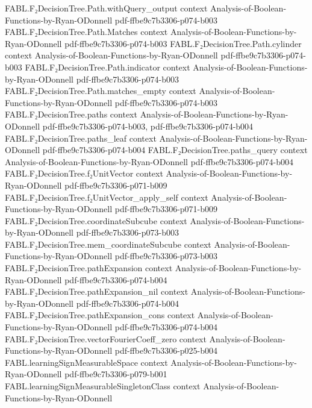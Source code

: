 \begin{theorem}
  {FABL.F₂DecisionTree.Path.withQuery_output}
  {context}
  {Analysis-of-Boolean-Functions-by-Ryan-ODonnell}
  {pdf-ffbe9c7b3306-p074-b003}
\proofstep
  {FABL.F₂DecisionTree.Path.Matches}
  {context}
  {Analysis-of-Boolean-Functions-by-Ryan-ODonnell}
  {pdf-ffbe9c7b3306-p074-b003}
\proofstep
  {FABL.F₂DecisionTree.Path.cylinder}
  {context}
  {Analysis-of-Boolean-Functions-by-Ryan-ODonnell}
  {pdf-ffbe9c7b3306-p074-b003}
\proofstep
  {FABL.F₂DecisionTree.Path.indicator}
  {context}
  {Analysis-of-Boolean-Functions-by-Ryan-ODonnell}
  {pdf-ffbe9c7b3306-p074-b003}
\proofstep
  {FABL.F₂DecisionTree.Path.matches_empty}
  {context}
  {Analysis-of-Boolean-Functions-by-Ryan-ODonnell}
  {pdf-ffbe9c7b3306-p074-b003}
\proofstep
  {FABL.F₂DecisionTree.paths}
  {context}
  {Analysis-of-Boolean-Functions-by-Ryan-ODonnell}
  {pdf-ffbe9c7b3306-p074-b003,
    pdf-ffbe9c7b3306-p074-b004}
\proofstep
  {FABL.F₂DecisionTree.paths_leaf}
  {context}
  {Analysis-of-Boolean-Functions-by-Ryan-ODonnell}
  {pdf-ffbe9c7b3306-p074-b004}
\proofstep
  {FABL.F₂DecisionTree.paths_query}
  {context}
  {Analysis-of-Boolean-Functions-by-Ryan-ODonnell}
  {pdf-ffbe9c7b3306-p074-b004}
\proofstep
  {FABL.F₂DecisionTree.f₂UnitVector}
  {context}
  {Analysis-of-Boolean-Functions-by-Ryan-ODonnell}
  {pdf-ffbe9c7b3306-p071-b009}
\proofstep
  {FABL.F₂DecisionTree.f₂UnitVector_apply_self}
  {context}
  {Analysis-of-Boolean-Functions-by-Ryan-ODonnell}
  {pdf-ffbe9c7b3306-p071-b009}
\proofstep
  {FABL.F₂DecisionTree.coordinateSubcube}
  {context}
  {Analysis-of-Boolean-Functions-by-Ryan-ODonnell}
  {pdf-ffbe9c7b3306-p073-b003}
\proofstep
  {FABL.F₂DecisionTree.mem_coordinateSubcube}
  {context}
  {Analysis-of-Boolean-Functions-by-Ryan-ODonnell}
  {pdf-ffbe9c7b3306-p073-b003}
\proofstep
  {FABL.F₂DecisionTree.pathExpansion}
  {context}
  {Analysis-of-Boolean-Functions-by-Ryan-ODonnell}
  {pdf-ffbe9c7b3306-p074-b004}
\proofstep
  {FABL.F₂DecisionTree.pathExpansion_nil}
  {context}
  {Analysis-of-Boolean-Functions-by-Ryan-ODonnell}
  {pdf-ffbe9c7b3306-p074-b004}
\proofstep
  {FABL.F₂DecisionTree.pathExpansion_cons}
  {context}
  {Analysis-of-Boolean-Functions-by-Ryan-ODonnell}
  {pdf-ffbe9c7b3306-p074-b004}
\proofstep
  {FABL.F₂DecisionTree.vectorFourierCoeff_zero}
  {context}
  {Analysis-of-Boolean-Functions-by-Ryan-ODonnell}
  {pdf-ffbe9c7b3306-p025-b004}
\proofstep
  {FABL.learningSignMeasurableSpace}
  {context}
  {Analysis-of-Boolean-Functions-by-Ryan-ODonnell}
  {pdf-ffbe9c7b3306-p079-b001}
\proofstep
  {FABL.learningSignMeasurableSingletonClass}
  {context}
  {Analysis-of-Boolean-Functions-by-Ryan-ODonnell}

\end{theorem}
